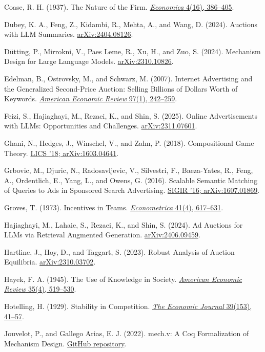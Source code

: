 Coase, R. H. (1937). The Nature of the Firm.
\href{https://doi.org/10.1111/j.1468-0335.1937.tb00002.x}{\emph{Economica}
4(16), 386--405}.

Dubey, K. A., Feng, Z., Kidambi, R., Mehta, A., and Wang, D. (2024).
Auctions with LLM Summaries.
\href{https://arxiv.org/abs/2404.08126}{arXiv:2404.08126}.

Dütting, P., Mirrokni, V., Paes Leme, R., Xu, H., and Zuo, S. (2024).
Mechanism Design for Large Language Models.
\href{https://arxiv.org/abs/2310.10826}{arXiv:2310.10826}.

Edelman, B., Ostrovsky, M., and Schwarz, M. (2007). Internet Advertising
and the Generalized Second-Price Auction: Selling Billions of Dollars
Worth of Keywords.
\href{https://www.aeaweb.org/articles?id=10.1257/aer.97.1.242}{\emph{American
Economic Review} 97(1), 242--259}.

Feizi, S., Hajiaghayi, M., Rezaei, K., and Shin, S. (2025). Online
Advertisements with LLMs: Opportunities and Challenges.
\href{https://arxiv.org/abs/2311.07601}{arXiv:2311.07601}.

Ghani, N., Hedges, J., Winschel, V., and Zahn, P. (2018). Compositional
Game Theory. \href{https://arxiv.org/abs/1603.04641}{LICS '18;
arXiv:1603.04641}.

Grbovic, M., Djuric, N., Radosavljevic, V., Silvestri, F., Baeza-Yates,
R., Feng, A., Ordentlich, E., Yang, L., and Owens, G. (2016). Scalable
Semantic Matching of Queries to Ads in Sponsored Search Advertising.
\href{https://arxiv.org/abs/1607.01869}{SIGIR '16; arXiv:1607.01869}.

Groves, T. (1973). Incentives in Teams.
\href{https://doi.org/10.2307/1914085}{\emph{Econometrica} 41(4),
617--631}.

Hajiaghayi, M., Lahaie, S., Rezaei, K., and Shin, S. (2024). Ad Auctions
for LLMs via Retrieval Augmented Generation.
\href{https://arxiv.org/abs/2406.09459}{arXiv:2406.09459}.

Hartline, J., Hoy, D., and Taggart, S. (2023). Robust Analysis of
Auction Equilibria.
\href{https://arxiv.org/abs/2310.03702}{arXiv:2310.03702}.

Hayek, F. A. (1945). The Use of Knowledge in Society.
\href{https://www.econlib.org/library/Essays/hykKnw.html}{\emph{American
Economic Review} 35(4), 519--530}.

Hotelling, H. (1929). Stability in Competition.
\href{https://doi.org/10.2307/2224214}{\emph{The Economic Journal}
39(153), 41--57}.

Jouvelot, P., and Gallego Arias, E. J. (2022). mech.v: A Coq
Formalization of Mechanism Design.
\href{https://github.com/jouvelot/mech.v}{GitHub repository}.

